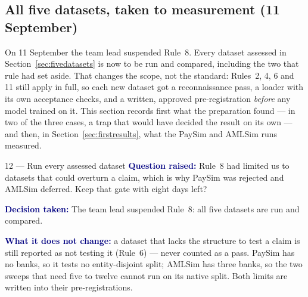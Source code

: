 \documentclass[11pt]{article}
\newcommand{\qlabel}[1]{\textbf{\textcolor{navy}{#1}}\;}
\begin{document}
\subsection{All five datasets, taken to measurement (11 September)}
\label{sec:allfive}

On 11 September the team lead suspended Rule~8. Every dataset assessed in
Section~\ref{sec:fivedatasets} is now to be run and compared, including the two that rule had set aside.
That changes the scope, not the standard: Rules~2, 4, 6 and 11 still apply in full, so each new dataset
got a reconnaissance pass, a loader with its own acceptance checks, and a written, approved
pre-registration \emph{before} any model trained on it. This section records first what the preparation
found --- in two of the three cases, a trap that would have decided the result on its own --- and then,
in Section~\ref{sec:firstresults}, what the PaySim and AMLSim runs measured.

\begin{decision}{12 --- Run every assessed dataset}
\qlabel{Question raised:} Rule~8 had limited us to datasets that could overturn a claim, which is why
PaySim was rejected and AMLSim deferred. Keep that gate with eight days left?

\qlabel{Decision taken:} The team lead suspended Rule~8: all five datasets are run and compared.

\qlabel{What it does not change:} a dataset that lacks the structure to test a claim is still reported
as not testing it (Rule~6) --- never counted as a pass. PaySim has no banks, so it tests no
entity-disjoint split; AMLSim has three banks, so the two sweeps that need five to twelve cannot run on
its native split. Both limits are written into their pre-registrations.
\end{decision}
\end{document}
